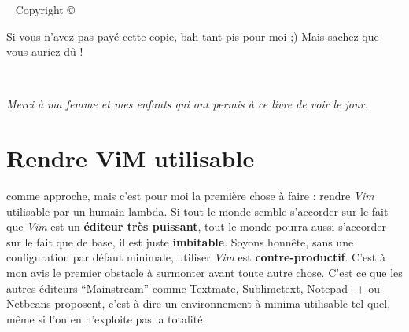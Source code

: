 



\frontmatter

\blankpage

\maketitle


\newpage
\begin{fullwidth}
~\vfill
\thispagestyle{empty}
\setlength{\parindent}{0pt}
\setlength{\parskip}{\baselineskip}
Copyright \copyright\ \the\year\ \thanklessauthor

\par{}

\par{}

\par Si vous n'avez pas payé cette copie, bah tant pis pour moi ;) Mais sachez que vous auriez dû !

\end{fullwidth}

\tableofcontents

\listoffigures

\listoftables

\cleardoublepage
~\vfill
\begin{doublespace}
\noindent\fontsize{18}{22}\selectfont\itshape
\nohyphenation
Merci à ma femme et mes enfants qui ont permis à ce livre de voir le jour.
\end{doublespace}
\vfill
\vfill

\cleardoublepage


\mainmatter

\chapter{Rendre ViM utilisable}

 comme approche, mais c'est pour moi la première chose à faire : rendre \emph{Vim} utilisable par un humain lambda. Si tout le monde semble s'accorder sur le fait que \emph{Vim} est un \textbf{éditeur très puissant}, tout le monde pourra aussi s'accorder sur le fait que de base, il est juste \textbf{imbitable}. Soyons honnête, sans une configuration par défaut minimale, utiliser \emph{Vim} est \textbf{contre-productif}. C'est à mon avis le premier obstacle à surmonter avant toute autre chose. C'est ce que les autres éditeurs ``Mainstream'' comme Textmate, Sublimetext, Notepad++ ou Netbeans proposent, c'est à dire un environnement à minima utilisable tel quel, même si l'on en n'exploite pas la totalité.

